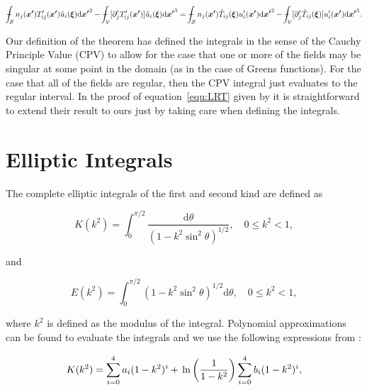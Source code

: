 \documentclass[12pt]{article}
\def\Xint#1{\mathchoice
{\XXint\displaystyle\textstyle{#1}}%
{\XXint\textstyle\scriptstyle{#1}}%
{\XXint\scriptstyle\scriptscriptstyle{#1}}%
{\XXint\scriptscriptstyle\scriptscriptstyle{#1}}%
\!\int}
\def\XXint#1#2#3{{\setbox0=\hbox{$#1{#2#3}{\int}$}
\vcenter{\hbox{$#2#3$}}\kern-.5\wd0}}
\def\dashint{\Xint-}
\begin{document}
\begin{equation}
\label{equ:LRT}
\dashint_{\mathcal{S}} n_{j}(\boldsymbol{x'}) T'_{ij}(\boldsymbol{x'}) \hat{u}_{i}(\boldsymbol{\xi}) \mathrm{d} \boldsymbol{x'}^{2} - \dashint_{\mathcal{V}} [\partial'_{j} T'_{ij}(\boldsymbol{x'})] \hat{u}_{i}(\boldsymbol{\xi}) \mathrm{d} \boldsymbol{x'}^{3} = \dashint_{\mathcal{S}} n_{j}(\boldsymbol{x'}) \hat{T}_{ij}(\boldsymbol{\xi}) u'_{i}(\boldsymbol{x'}) \mathrm{d} \boldsymbol{x'}^{2} - \dashint_{\mathcal{V}} [\partial'_{j}\hat{T}_{ij}(\boldsymbol{\xi})] u'_{i}(\boldsymbol{x'}) \mathrm{d} \boldsymbol{x'}^{3} .
\end{equation}

Our definition of the theorem has defined the integrals in the sense of the Cauchy Principle Value (CPV) \citep{Riley06} to allow for the case that one or more of the fields may be singular at some point in the domain (as in the case of Greens functions). For the case that all of the fields are regular, then the CPV integral just evaluates to the regular interval. In the proof of equation~\ref{equ:LRT} given by \citet{Kim05} it is straightforward to extend their result to ours just by taking care when defining the integrals. 

\section{Elliptic Integrals}
\label{app:ellip}

The complete elliptic integrals of the first and second kind are defined as \citep{Abramowitz72}

\begin{equation}
\label{equ:ellip1}
K(k^{2}) = \int_{0}^{\pi/2} \frac{\mathrm{d}\theta}{(1 - k^{2} \sin^{2}\theta)^{1/2}}, \quad 0 \leq k^{2} < 1,
\end{equation}

and

\begin{equation}
\label{equ:ellip2}
E(k^{2}) = \int_{0}^{\pi/2} (1 - k^{2} \sin^{2}\theta)^{1/2} \mathrm{d}\theta, \quad 0 \leq k^{2} < 1,
\end{equation}


where $k^{2}$ is defined as the modulus of the integral. Polynomial approximations can be found to evaluate the integrals \citep{Roumeliotis00} and we use the following expressions from \citet{Abramowitz72}:

\begin{equation}
\label{equ:ellip1_app}
K(k^{2}) = \sum_{i = 0}^{4} a_{i} (1 - k^{2})^{i} + \\\ln\left(\frac{1}{1 - k^{2}} \right) \sum_{i = 0}^{4} b_{i} (1 - k^{2})^{i},
\end{equation}
\end{document}
